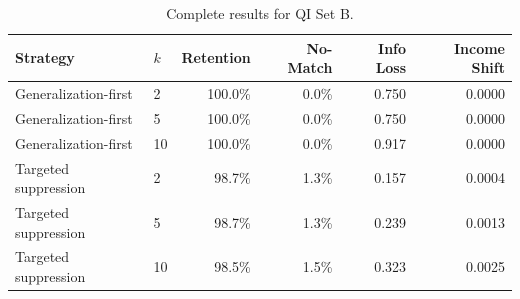 \documentclass[11pt]{article}
\begin{document}
\begin{table}[H]
\centering
\scriptsize
\begin{tabular}{llrrrr}
\toprule
\textbf{Strategy} & \textbf{$k$} & \textbf{Retention} & \textbf{No-Match} & \textbf{Info Loss} & \textbf{Income Shift} \\
\midrule
Generalization-first & 2 & 100.0\% & 0.0\% & 0.750 & 0.0000 \\
Generalization-first & 5 & 100.0\% & 0.0\% & 0.750 & 0.0000 \\
Generalization-first & 10 & 100.0\% & 0.0\% & 0.917 & 0.0000 \\
Targeted suppression & 2 & 98.7\% & 1.3\% & 0.157 & 0.0004 \\
Targeted suppression & 5 & 98.7\% & 1.3\% & 0.239 & 0.0013 \\
Targeted suppression & 10 & 98.5\% & 1.5\% & 0.323 & 0.0025 \\
\bottomrule
\end{tabular}
\caption{Complete results for QI Set B.}
\label{tab:appendix_set_b}
\end{table}
\end{document}
